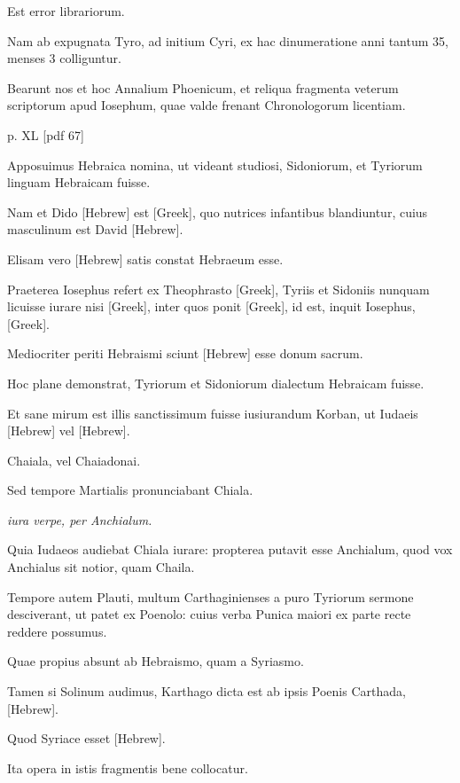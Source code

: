 \begin{parnumbers}
Est error librariorum.

Nam ab expugnata
Tyro, ad initium Cyri, ex hac dinumeratione anni tantum
35, menses 3 colliguntur.

Bearunt nos et hoc Annalium Phoenicum,
et reliqua fragmenta veterum scriptorum apud Iosephum, quae valde
frenant Chronologorum licentiam.

\clearpage
p. XL [pdf 67]

Apposuimus Hebraica
nomina, ut videant studiosi, Sidoniorum, et Tyriorum linguam
Hebraicam fuisse.

Nam et Dido \texthebrew{[Hebrew]} est \textgreek{[Greek]}, quo nutrices
infantibus blandiuntur, cuius masculinum est David \texthebrew{[Hebrew]}.

Elisam
vero \texthebrew{[Hebrew]} satis constat Hebraeum esse.

Praeterea Iosephus refert
ex Theophrasto \textgreek{[Greek]}, Tyriis et Sidoniis nunquam licuisse
iurare nisi \textgreek{[Greek]},
 inter quos ponit \textgreek{[Greek]}, id est, inquit
Iosephus, \textgreek{[Greek]}.

Mediocriter periti Hebraismi sciunt \texthebrew{[Hebrew]} esse
donum sacrum.

Hoc plane demonstrat, Tyriorum et Sidoniorum
dialectum Hebraicam fuisse.

Et sane mirum est illis sanctissimum
fuisse iusiurandum Korban, ut Iudaeis
 \texthebrew{[Hebrew]} vel \texthebrew{[Hebrew]}.

Chaiala,
vel Chaiadonai.

Sed tempore Martialis pronunciabant Chiala.

\textit{iura verpe, per Anchialum.}

Quia Iudaeos audiebat Chiala iurare:
propterea putavit esse Anchialum, quod vox Anchialus sit notior,
quam Chaila.

Tempore autem Plauti, multum Carthaginienses
a puro Tyriorum sermone desciverant, ut patet ex Poenolo:
cuius verba Punica maiori ex parte recte reddere possumus.

Quae propius absunt ab Hebraismo, quam a Syriasmo.

Tamen
si Solinum audimus, Karthago dicta est ab ipsis Poenis Carthada,
\texthebrew{[Hebrew]}.

Quod Syriace esset \texthebrew{[Hebrew]}.

Ita opera in istis fragmentis
bene collocatur.


\end{parnumbers}
